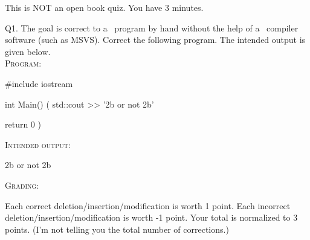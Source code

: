 


\renewcommand\TITLE{Quiz q0102}


\topmatter

This is NOT an open book quiz. 
You have 3 minutes. 

Q1.
The goal is correct to a \cpp\ program by hand without the help of a \cpp\ 
compiler software (such as MSVS).
Correct the following program.
The intended output is given below.
\\
\textsc{Program:}
\begin{console}
#include iostream

int Main()
(
    std::cout >> '2b or not 2b'

    return 0
)
\end{console}
\textsc{Intended output:}
\begin{console}
2b or not 2b
\end{console}

\textsc{Grading}:
\begin{tightlist}
\li Each correct deletion/insertion/modification is worth 1 point.
\li Each incorrect deletion/insertion/modification is worth -1 point.
\li Your total is normalized to 3 points. 
(I'm not telling you the total number of corrections.)
\end{tightlist}

